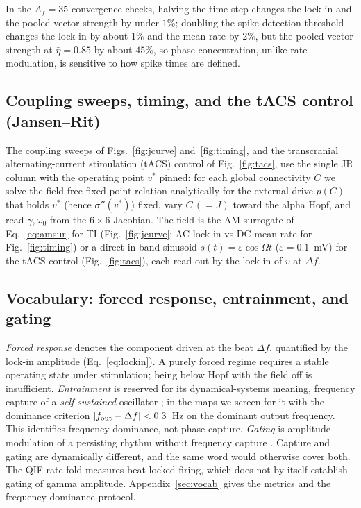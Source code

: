 \documentclass[11pt,a4paper]{article}
\newcommand{\Sig}{\sigma}
\begin{document}
In the $A_f=35$ convergence checks, halving the time step changes the lock-in and the pooled vector
strength by under $1\%$; doubling the spike-detection threshold changes the lock-in by
about $1\%$ and the mean rate by $2\%$, but the pooled vector strength at
$\bar\eta=0.85$ by about $45\%$, so phase concentration, unlike rate modulation, is sensitive to
how spike times are defined.

\subsection{Coupling sweeps, timing, and the tACS control (Jansen--Rit)}
The coupling sweeps of Figs.~\ref{fig:jcurve} and~\ref{fig:timing}, and the transcranial
alternating-current stimulation (tACS) control of Fig.~\ref{fig:tacs}, use the single JR
column with the operating point $v^*$ pinned: for
each global connectivity $C$ we solve the field-free fixed-point relation analytically
for the external drive $p(C)$ that holds $v^*$ (hence $\Sig''(v^*)$) fixed, vary $C\,(=J)$
toward the alpha Hopf, and read $\gamma,\omega_0$ from the $6\times6$ Jacobian. The field
is the AM surrogate of Eq.~\eqref{eq:amsur} for TI (Fig.~\ref{fig:jcurve}; AC lock-in vs DC mean
rate for Fig.~\ref{fig:timing}) or a direct in-band sinusoid $s(t)=\varepsilon\cos\Omega t$
($\varepsilon=0.1$~mV) for the tACS control (Fig.~\ref{fig:tacs}), each read out by the
lock-in of $v$ at $\Delta f$.

\subsection{Vocabulary: forced response, entrainment, and gating}
\emph{Forced response} denotes the component driven at the beat $\Delta f$,
quantified by the lock-in amplitude (Eq.~\eqref{eq:lockin}). A purely forced regime
requires a stable operating state under stimulation; being below Hopf with the field
off is insufficient. \emph{Entrainment} is reserved for its
dynamical-systems meaning, frequency capture of a \emph{self-sustained} oscillator
\cite{pikovsky2001}; in the maps we screen for it with the dominance criterion
$|f_{\rm out}-\Delta f|<0.3$~Hz on the dominant output frequency. This identifies
frequency dominance, not phase capture. \emph{Gating} is amplitude modulation of a persisting rhythm without
frequency capture \cite{canolty2010,tort2010}. Capture and gating are dynamically different, and the same word would otherwise cover
both. The QIF rate fold measures beat-locked firing, which does not by itself
establish gating of gamma amplitude. Appendix~\ref{sec:vocab} gives the metrics
and the frequency-dominance protocol.
\end{document}
